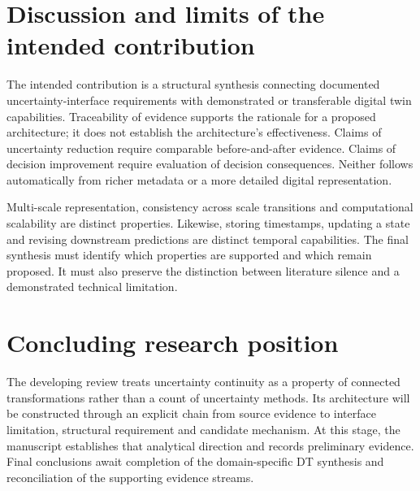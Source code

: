 \section{Discussion and limits of the intended contribution}
The intended contribution is a structural synthesis connecting documented uncertainty-interface requirements with demonstrated or transferable digital twin capabilities. Traceability of evidence supports the rationale for a proposed architecture; it does not establish the architecture's effectiveness. Claims of uncertainty reduction require comparable before-and-after evidence. Claims of decision improvement require evaluation of decision consequences. Neither follows automatically from richer metadata or a more detailed digital representation.

Multi-scale representation, consistency across scale transitions and computational scalability are distinct properties. Likewise, storing timestamps, updating a state and revising downstream predictions are distinct temporal capabilities. The final synthesis must identify which properties are supported and which remain proposed. It must also preserve the distinction between literature silence and a demonstrated technical limitation.

\section{Concluding research position}
The developing review treats uncertainty continuity as a property of connected transformations rather than a count of uncertainty methods. Its architecture will be constructed through an explicit chain from source evidence to interface limitation, structural requirement and candidate mechanism. At this stage, the manuscript establishes that analytical direction and records preliminary evidence. Final conclusions await completion of the domain-specific DT synthesis and reconciliation of the supporting evidence streams.
